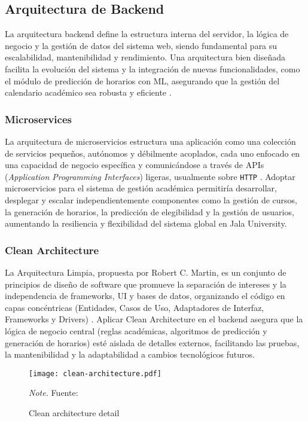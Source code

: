 \subsection{Arquitectura de Backend}
La arquitectura backend define la estructura interna del servidor, la lógica de negocio y la gestión de datos del sistema web, siendo fundamental para su escalabilidad, mantenibilidad y rendimiento.
Una arquitectura bien diseñada facilita la evolución del sistema y la integración de nuevas funcionalidades, como el módulo de predicción de horarios con ML, asegurando que la gestión del calendario académico sea robusta y eficiente \parencite{Richards2015}.

\subsubsection{Microservices}
La arquitectura de microservicios estructura una aplicación como una colección de servicios pequeños, autónomos y débilmente acoplados, cada uno enfocado en una capacidad de negocio específica y comunicándose a través de APIs (\textit{Application Programming Interfaces}) ligeras, usualmente sobre \texttt{HTTP} \parencite{Newman2015}.
Adoptar microservicios para el sistema de gestión académica permitiría desarrollar, desplegar y escalar independientemente componentes como la gestión de cursos, la generación de horarios, la predicción de elegibilidad y la gestión de usuarios, aumentando la resiliencia y flexibilidad del sistema global en Jala University.

\subsubsection{Clean Architecture}
La Arquitectura Limpia, propuesta por Robert C.
Martin, es un conjunto de principios de diseño de software que promueve la separación de intereses y la independencia de frameworks, UI y bases de datos, organizando el código en capas concéntricas (Entidades, Casos de Uso, Adaptadores de Interfaz, Frameworks y Drivers) \parencite{Martin2017}.
Aplicar Clean Architecture en el backend asegura que la lógica de negocio central (reglas académicas, algoritmos de predicción y generación de horarios) esté aislada de detalles externos, facilitando las pruebas, la mantenibilidad y la adaptabilidad a cambios tecnológicos futuros.

\begin{figure}
    \centering
	\caption{Clean architecture detail} \label{fig:cleanCodeBlog}
	\texttt{[image: clean-architecture.pdf]}

    \vspace{0.5em}
    \begin{minipage}{\textwidth}
        \small\textit{Note.} Fuente: \textcite{CleanCodeBlog}
    \end{minipage}
\end{figure}

